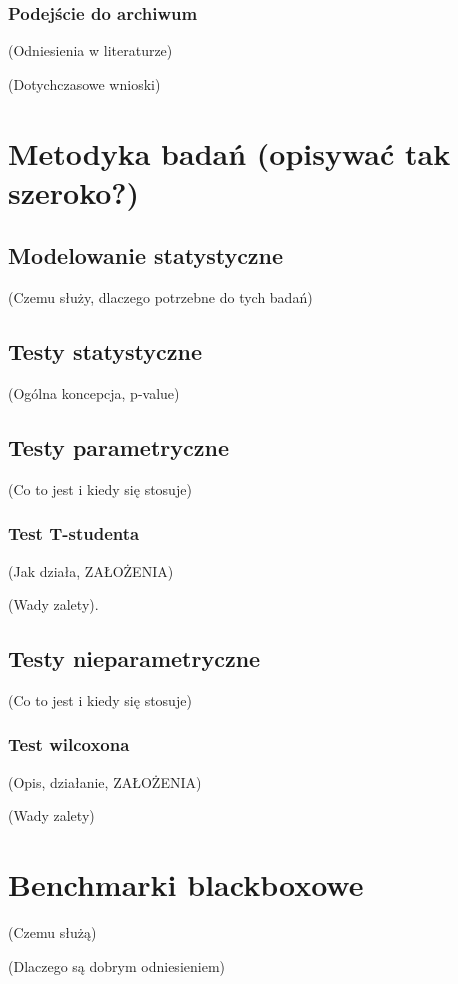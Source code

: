 \documentclass[11pt,a4paper]{report}
\begin{document}
{{\subsubsection{Podejście do archiwum}
\par{(Odniesienia w literaturze)}
\par{(Dotychczasowe wnioski)}

\section{Metodyka badań (opisywać tak szeroko?)}
\subsection{Modelowanie statystyczne}
\par{
(Czemu służy, dlaczego potrzebne do tych badań)
}
\subsection{Testy statystyczne}
\par{
(Ogólna koncepcja, p-value)
}
\subsection{Testy parametryczne}
\par{
(Co to jest i kiedy się stosuje)
}
\subsubsection{Test T-studenta}
\par{
(Jak działa, ZAŁOŻENIA)
}
\par{
(Wady zalety).
}

\subsection{Testy nieparametryczne}
\par{
(Co to jest i kiedy się stosuje)
}
\subsubsection{Test wilcoxona}
\par{
(Opis, działanie, ZAŁOŻENIA)
}
\par{
(Wady zalety)
}
\section{Benchmarki blackboxowe}
\par{
(Czemu służą)
}
\par{
(Dlaczego są dobrym odniesieniem)
}

}}
\end{document}
